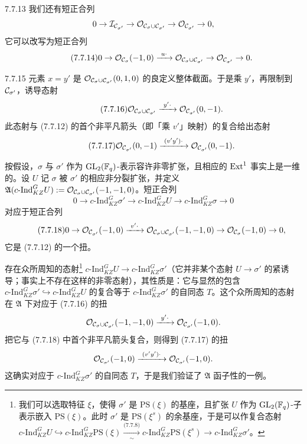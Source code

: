 \begin{exam}{7.7.13}\label{thm:a4-7-7-13}
我们还有短正合列
\[
0\to\mathcal I_{\mathcal{C}_{\sigma'}}\to\mathcal{O}_{\mathcal{C}_\sigma\cup\mathcal{C}_{\sigma'}}\to\mathcal{O}_{\mathcal{C}_{\sigma'}}\to0,
\]
它可以改写为短正合列
\begin{equation}\tag{7.7.14}\label{eq:a4-7-7-14}
0\to\OO_{\CC_\sigma}(-1,0)\xrightarrow{\ u\cdot\ }\OO_{\CC_\sigma\cup\CC_{\sigma'}}\to\OO_{\CC_{\sigma'}}\to0.
\end{equation}
\end{exam}

\begin{exam}{7.7.15}\label{thm:a4-7-7-15}
元素 $x=y'$ 是 $\mathcal{O}_{\mathcal{C}_\sigma\cup\mathcal{C}_{\sigma'}}(0,1,0)$ 的良定义整体截面。于是乘 $y'$，再限制到 $\mathcal{C}_{\sigma'}$，诱导态射
\begin{equation}\tag{7.7.16}\label{eq:a4-7-7-16}
\OO_{\CC_\sigma\cup\CC_{\sigma'}}\xrightarrow{\ y'\cdot\ }\OO_{\CC_{\sigma'}}(0,-1).
\end{equation}
此态射与 (7.7.12) 的首个非平凡箭头（即「乘 $v'$」映射）的复合给出态射
\begin{equation}\tag{7.7.17}\label{eq:a4-7-7-17}
\OO_{\CC_{\sigma'}}(0,-1)\xrightarrow{\ (v'y')\cdot\ }\OO_{\CC_{\sigma'}}(0,-1).
\end{equation}
\end{exam}

按假设，$\sigma$ 与 $\sigma'$ 作为 $\mathrm{GL}_2(\mathbb{F}_q)$-表示容许非零扩张，且相应的 $\operatorname{Ext}^1$ 事实上是一维的。设 $U$ 记 $\sigma$ 被 $\sigma'$ 的相应非分裂扩张，并定义 $\mathfrak A(c\text{-}\mathrm{Ind}^G_{KZ}U):=\mathcal{O}_{\mathcal{C}_\sigma\cup\mathcal{C}_{\sigma'}}(-1,-1,0)$。短正合列
\[
0\to c\text{-}\mathrm{Ind}^G_{KZ}\sigma'\to c\text{-}\mathrm{Ind}^G_{KZ}U\to c\text{-}\mathrm{Ind}^G_{KZ}\sigma\to0
\]
对应于短正合列
\begin{equation}\tag{7.7.18}\label{eq:a4-7-7-18}
0\to\OO_{\CC_{\sigma'}}(-1,0)\xrightarrow{\ v'\cdot\ }\OO_{\CC_\sigma\cup\CC_{\sigma'}}(-1,-1,0)\to\OO_{\CC_\sigma}(-1,0)\to0,
\end{equation}
它是 (7.7.12) 的一个扭。

存在众所周知的态射\footnote{我们可以选取特征 $\xi$，使得 $\sigma'$ 是 $\mathrm{PS}(\xi)$ 的基座，且扩张 $U$ 作为 $\mathrm{GL}_2(\mathbb{F}_q)$-子表示嵌入 $\mathrm{PS}(\xi)$。此时 $\sigma'$ 是 $\mathrm{PS}(\xi^s)$ 的余基座，于是可以作复合态射
$c\text{-}\mathrm{Ind}^G_{KZ}U\hookrightarrow c\text{-}\mathrm{Ind}^G_{KZ}\mathrm{PS}(\xi)\xrightarrow[\sim]{\text{(7.7.8)}}c\text{-}\mathrm{Ind}^G_{KZ}\mathrm{PS}(\xi^s)\to c\text{-}\mathrm{Ind}^G_{KZ}\sigma'$。} $c\text{-}\mathrm{Ind}^G_{KZ}U\to c\text{-}\mathrm{Ind}^G_{KZ}\sigma'$（它并非某个态射 $U\to\sigma'$ 的紧诱导；事实上不存在这样的非零态射），其性质是：它与显然的包含 $c\text{-}\mathrm{Ind}^G_{KZ}\sigma'\hookrightarrow c\text{-}\mathrm{Ind}^G_{KZ}U$ 的复合等于 $c\text{-}\mathrm{Ind}^G_{KZ}\sigma'$ 的自同态 $T$。这个众所周知的态射在 $\mathfrak A$ 下对应于 (7.7.16) 的扭
\[
\OO_{\CC_\sigma\cup\CC_{\sigma'}}(-1,-1,0)\xrightarrow{\ y'\cdot\ }\OO_{\CC_{\sigma'}}(-1,0).
\]
把它与 (7.7.18) 中首个非平凡箭头复合，则得到 (7.7.17) 的扭
\[
\OO_{\CC_{\sigma'}}(-1,0)\xrightarrow{\ (v'y')\cdot\ }\OO_{\CC_{\sigma'}}(-1,0).
\]
这确实对应于 $c\text{-}\mathrm{Ind}^G_{KZ}\sigma'$ 的自同态 $T$，于是我们验证了 $\mathfrak A$ 函子性的一例。

